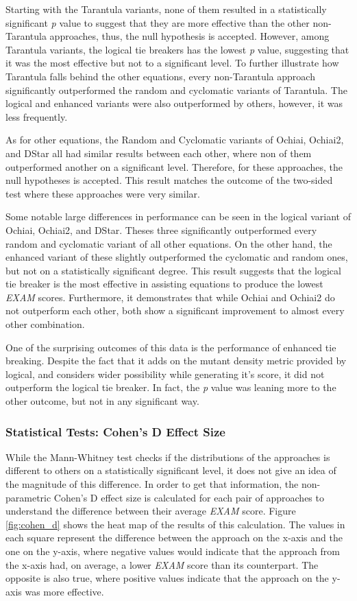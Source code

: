 Starting with the Tarantula variants, none of them resulted in a statistically
significant \emph{p} value to suggest that they are more effective than the
other non-Tarantula approaches, thus, the null hypothesis is accepted. However,
among Tarantula variants, the logical tie breakers has the lowest \emph{p}
value, suggesting that it was the most effective but not to a significant level.
To further illustrate how Tarantula falls behind the other equations, every
non-Tarantula approach significantly outperformed the random and cyclomatic
variants of Tarantula. The logical and enhanced variants were also outperformed
by others, however, it was less frequently.

As for other equations, the Random and Cyclomatic variants of Ochiai, Ochiai2,
and DStar all had similar results between each other, where non of them
outperformed another on a significant level. Therefore, for these approaches,
the null hypotheses is accepted. This result matches the outcome of the
two-sided test where these approaches were very similar.

Some notable large differences in performance can be seen in the logical variant
of Ochiai, Ochiai2, and DStar. Theses three significantly outperformed every
random and cyclomatic variant of all other equations. On the other hand, the
enhanced variant of these slightly outperformed the cyclomatic and random ones,
but not on a statistically significant degree. This result suggests that the
logical tie breaker is the most effective in assisting equations to produce the
lowest \emph{EXAM} scores. Furthermore, it demonstrates that while Ochiai and
Ochiai2 do not outperform each other, both show a significant improvement to
almost every other combination.

One of the surprising outcomes of this data is the performance of enhanced tie
breaking. Despite the fact that it adds on the mutant density metric provided by
logical, and considers wider possibility while generating it's score, it did not
outperform the logical tie breaker. In fact, the \emph{p} value was leaning more
to the other outcome, but not in any significant way.

\subsubsection{Statistical Tests: Cohen's D Effect Size}
\label{subsubsec:statistical_test_cohen}

While the Mann-Whitney test checks if the distributions of the approaches is
different to others on a statistically significant level, it does not give an
idea of the magnitude of this difference. In order to get that information, the
non-parametric Cohen's D effect size is calculated for each pair of approaches
to understand the difference between their average \emph{EXAM} score. Figure
\ref{fig:cohen_d} shows the heat map of the results of this calculation. The
values in each square represent the difference between the approach on the
x-axis and the one on the y-axis, where negative values would indicate that the
approach from the x-axis had, on average, a lower \emph{EXAM} score than its
counterpart. The opposite is also true, where positive values indicate that the
approach on the y-axis was more effective.

